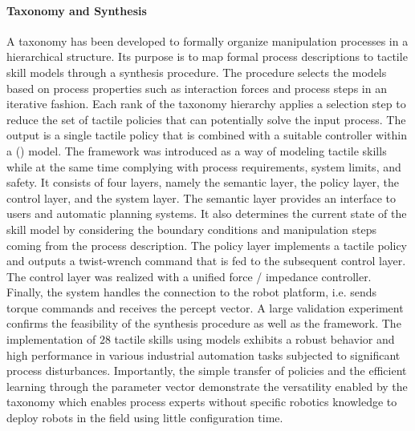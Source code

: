 \paragraph{Taxonomy and Synthesis}
A taxonomy has been developed to formally organize manipulation processes in a hierarchical structure.
Its purpose is to map formal process descriptions to tactile skill models through a synthesis procedure.
The procedure selects the models based on process properties such as interaction forces and process steps in an iterative fashion.
Each rank of the taxonomy hierarchy applies a selection step to reduce the set of tactile policies that can potentially solve the input process.
The output is a single tactile policy that is combined with a suitable controller within a \skillmodel (\skillmodelabbr{}) model.
The \skillmodelabbr{} framework was introduced as a way of modeling tactile skills while at the same time complying with process requirements, system limits, and safety.
It consists of four layers, namely the semantic layer, the policy layer, the control layer, and the system layer.
The semantic layer provides an interface to users and automatic planning systems. It also determines the current state of the skill model by considering the boundary conditions and manipulation steps coming from the process description.
The policy layer implements a tactile policy and outputs a twist-wrench command that is fed to the subsequent control layer.
The control layer was realized with a unified force / impedance controller.
Finally, the system handles the connection to the robot platform, i.e. sends torque commands and receives the percept vector.
A large validation experiment confirms the feasibility of the synthesis procedure as well as the \skillmodelabbr{} framework.
The implementation of $28$ tactile skills using \skillmodelabbr{} models exhibits a robust behavior and high performance in various industrial automation tasks subjected to significant process disturbances.
Importantly, the simple transfer of policies and the efficient learning through the parameter vector demonstrate the versatility enabled by the taxonomy which enables process experts without specific robotics knowledge to deploy robots in the field using little configuration time.

